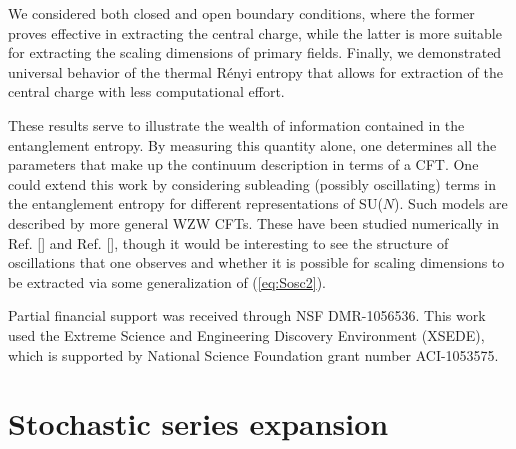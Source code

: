 \documentclass[aps,prb,reprint,floatfix]{revtex4-1}
\begin{document}
We considered both closed and open boundary conditions, where the former proves effective in extracting the central charge, while the latter is more suitable for extracting the scaling dimensions of primary fields.  Finally, we demonstrated universal behavior of the thermal R\'{e}nyi entropy that allows for extraction of the central charge with less computational effort.

These results serve to illustrate the wealth of information contained in the entanglement entropy.  By measuring this quantity alone, one determines all the parameters that make up the continuum description in terms of a CFT.  One could extend this work by considering subleading (possibly oscillating) terms in the entanglement entropy for different representations of SU($N$). Such models are described by more general WZW CFTs.  These have been studied numerically in Ref. [] and Ref. [], though it would be interesting to see the structure of oscillations that one observes and whether it is possible for scaling dimensions to be extracted via some generalization of (\ref{eq:Sosc2}).

Partial financial support was received through NSF DMR-1056536. This work used the Extreme Science and Engineering Discovery Environment (XSEDE), which is supported by National Science Foundation grant number ACI-1053575.
\appendix
\section{Stochastic series expansion}\label{app_a}
\end{document}
